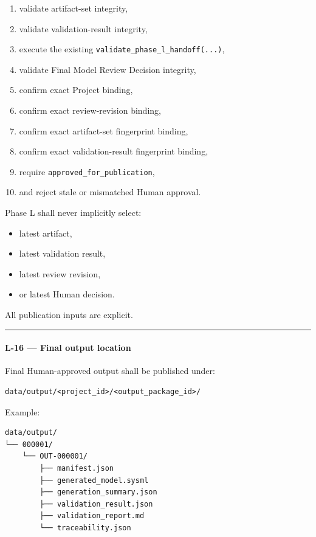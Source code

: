 \begin{enumerate}
\def\labelenumi{\arabic{enumi}.}
\tightlist
\item
  validate artifact-set integrity,
\item
  validate validation-result integrity,
\item
  execute the existing \texttt{validate\_phase\_l\_handoff(...)},
\item
  validate Final Model Review Decision integrity,
\item
  confirm exact Project binding,
\item
  confirm exact review-revision binding,
\item
  confirm exact artifact-set fingerprint binding,
\item
  confirm exact validation-result fingerprint binding,
\item
  require \texttt{approved\_for\_publication},
\item
  and reject stale or mismatched Human approval.
\end{enumerate}

Phase L shall never implicitly select:

\begin{itemize}
\tightlist
\item
  latest artifact,
\item
  latest validation result,
\item
  latest review revision,
\item
  or latest Human decision.
\end{itemize}

All publication inputs are explicit.

\begin{center}\rule{0.5\linewidth}{0.5pt}\end{center}

\hypertarget{l-16--final-output-location}{%
\paragraph{L-16 --- Final output location}\label{l-16--final-output-location}}

Final Human-approved output shall be published under:

\begin{verbatim}
data/output/<project_id>/<output_package_id>/
\end{verbatim}

Example:

\begin{verbatim}
data/output/
└── 000001/
    └── OUT-000001/
        ├── manifest.json
        ├── generated_model.sysml
        ├── generation_summary.json
        ├── validation_result.json
        ├── validation_report.md
        └── traceability.json
\end{verbatim}

